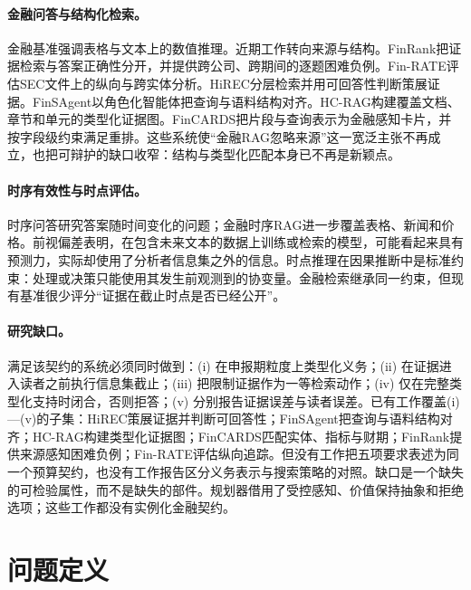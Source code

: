 \documentclass[10.5pt,a4paper]{ctexart}
\begin{document}
\paragraph{金融问答与结构化检索。}金融基准强调表格与文本上的数值推理\citep{chen2021finqa,zhu2021tatqa,islam2023financebench}。近期工作转向来源与结构。FinRank把证据检索与答案正确性分开，并提供跨公司、跨期间的逐题困难负例\citep{mansouri2026finrank}。Fin-RATE评估SEC文件上的纵向与跨实体分析\citep{jiang2026finrate}。HiREC分层检索并用可回答性判断策展证据\citep{choe2025hirec}。FinSAgent以角色化智能体把查询与语料结构对齐\citep{chi2026finsagent}。HC-RAG构建覆盖文档、章节和单元的类型化证据图\citep{chen2026hcrag}。FinCARDS把片段与查询表示为金融感知卡片，并按字段级约束满足重排\citep{zhou2026fincards}。这些系统使“金融RAG忽略来源”这一宽泛主张不再成立，也把可辩护的缺口收窄：结构与类型化匹配本身已不再是新颖点。

\paragraph{时序有效性与时点评估。}时序问答研究答案随时间变化的问题\citep{chen2021timeqa}；金融时序RAG进一步覆盖表格、新闻和价格\citep{zhu2025fintmmb}。前视偏差表明，在包含未来文本的数据上训练或检索的模型，可能看起来具有预测力，实际却使用了分析者信息集之外的信息\citep{sarkar2025lookahead}。时点推理在因果推断中是标准约束：处理或决策只能使用其发生前观测到的协变量\citep{hernan2020causal}。金融检索继承同一约束，但现有基准很少评分“证据在截止时点是否已经公开”。

\paragraph{研究缺口。}满足该契约的系统必须同时做到：(i) 在申报期粒度上类型化义务；(ii) 在证据进入读者之前执行信息集截止；(iii) 把限制证据作为一等检索动作；(iv) 仅在完整类型化支持时闭合，否则拒答；(v) 分别报告证据误差与读者误差。已有工作覆盖(i)—(v)的子集：HiREC策展证据并判断可回答性；FinSAgent把查询与语料结构对齐；HC-RAG构建类型化证据图；FinCARDS匹配实体、指标与财期；FinRank提供来源感知困难负例；Fin-RATE评估纵向追踪。但没有工作把五项要求表述为同一个预算契约，也没有工作报告区分义务表示与搜索策略的对照。缺口是一个缺失的可检验属性，而不是缺失的部件。规划器借用了受控感知\citep{krishnamurthy2017pomdp,satsangi2018active}、价值保持抽象\citep{li2006abstraction,abel2020abstraction}和拒绝选项\citep{geifman2017selective,chow1970optimum}；这些工作都没有实例化金融契约。

\section{问题定义}
\label{sec:problem}
\end{document}

